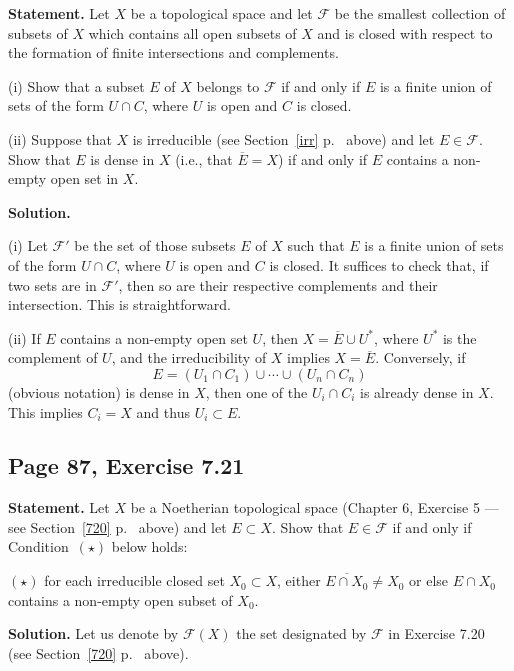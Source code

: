 \documentclass[parskip=half,fontsize=12pt]{scrartcl}%
\begin{document}
\textbf{Statement.} Let $X$ be a topological space and let $\mathcal F$ be the smallest collection of subsets of $X$ which contains all open subsets of $X$ and is closed with respect to the formation of finite intersections and complements.

(i) Show that a subset $E$ of $X$ belongs to $\mathcal F$ if and only if $E$ is a finite union of sets of the form $U\cap C$, where $U$ is open and $C$ is closed.

(ii) Suppose that $X$ is irreducible (see Section~\ref{irr} p.~\pageref{irr} above) and let $E\in\mathcal F$. Show that $E$ is dense in $X$ (i.e., that $\overline E=X$) if and only if $E$ contains a non-empty open set in $X$. 

\textbf{Solution.}

(i) Let $\mathcal F'$ be the set of those subsets $E$ of $X$ such that $E$ is a finite union of sets of the form $U\cap C$, where $U$ is open and $C$ is closed. It suffices to check that, if two sets are in $\mathcal F'$, then so are their respective complements and their intersection. This is straightforward. 

(ii) If $E$ contains a non-empty open set $U$, then $X=\overline E\cup U^*$, where $U^*$ is the complement of $U$, and the irreducibility of $X$ implies $X=\overline E$. Conversely, if 
$$
E=(U_1\cap C_1)\cup\cdots\cup(U_n\cap C_n)
$$ 
(obvious notation) is dense in $X$, then one of the $U_i\cap C_i$ is already dense in $X$. This implies $C_i=X$ and thus $U_i\subset E$.

\subsection{Page 87, Exercise 7.21}%

\textbf{Statement.} Let $X$ be a Noetherian topological space (Chapter 6, Exercise 5 --- see Section~\ref{720} p.~\pageref{720} above) and let $E\subset X$. Show that $E\in\mathcal F$ if and only if Condition~$(\star)$ below holds: 

$(\star)$ for each irreducible closed set $X_0\subset X$, either $\overline{E\cap X_0}\ne X_0$ or else $E\cap X_0$ contains a non-empty open subset of $X_0$.%

\textbf{Solution.} Let us denote by $\mathcal F(X)$ the set designated by $\mathcal F$ in Exercise 7.20 (see Section~\ref{720} p.~\pageref{720} above). 
\end{document}
